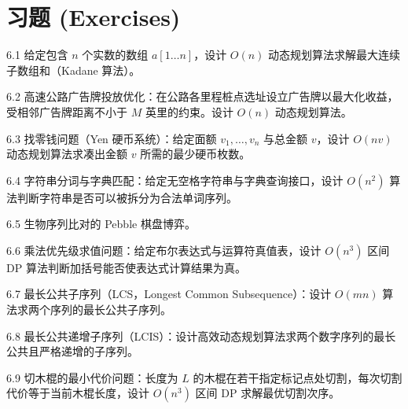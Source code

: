 \newpage
\section*{习题 (Exercises)}

\begin{exercise}{6.1}
给定包含 $n$ 个实数的数组 $a[1 \dots n]$，设计 $O(n)$ 动态规划算法求解最大连续子数组和（Kadane 算法）。
\end{exercise}

\begin{exercise}{6.2}
高速公路广告牌投放优化：在公路各里程桩点选址设立广告牌以最大化收益，受相邻广告牌距离不小于 $M$ 英里的约束。设计 $O(n)$ 动态规划算法。
\end{exercise}

\begin{exercise}{6.3}
找零钱问题（Yen 硬币系统）：给定面额 $v_1, \dots, v_n$ 与总金额 $v$，设计 $O(nv)$ 动态规划算法求凑出金额 $v$ 所需的最少硬币枚数。
\end{exercise}

\begin{exercise}{6.4}
字符串分词与字典匹配：给定无空格字符串与字典查询接口，设计 $O(n^2)$ 算法判断字符串是否可以被拆分为合法单词序列。
\end{exercise}

\begin{exercise}{6.5}
生物序列比对的 Pebble 棋盘博弈。
\end{exercise}

\begin{exercise}{6.6}
乘法优先级求值问题：给定布尔表达式与运算符真值表，设计 $O(n^3)$ 区间 DP 算法判断加括号能否使表达式计算结果为真。
\end{exercise}

\begin{exercise}{6.7}
最长公共子序列（LCS，Longest Common Subsequence）：设计 $O(mn)$ 算法求两个序列的最长公共子序列。
\end{exercise}

\begin{exercise}{6.8}
最长公共递增子序列（LCIS）：设计高效动态规划算法求两个数字序列的最长公共且严格递增的子序列。
\end{exercise}

\begin{exercise}{6.9}
切木棍的最小代价问题：长度为 $L$ 的木棍在若干指定标记点处切割，每次切割代价等于当前木棍长度，设计 $O(n^3)$ 区间 DP 求解最优切割次序。
\end{exercise}

